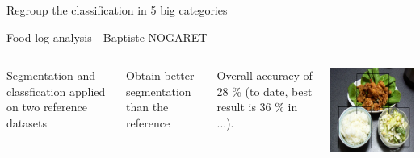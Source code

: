 \documentclass[aspectratio=169]{beamer}
\newenvironment{myframe}[1][t]{\begin{frame}[#1]{\secname}{\subsecname}}{\end{frame}}
\begin{document}
    \begin{myframe}
        Regroup the classification in 5 big categories
    \end{myframe}
    
    \begin{frame}{Food log analysis - Baptiste NOGARET}        
        \begin{columns}
            
            Segmentation and classfication applied on two reference datasets
            
            Obtain better segmentation than the reference
            
            Overall accuracy of 28 \% (to date, best result is 36 \% in ...).
            
            \includegraphics[width=\textwidth]{../img/seg_97_gt}
        \end{columns}
    \end{frame}


%        
%
%             
%                
   
\end{document}
